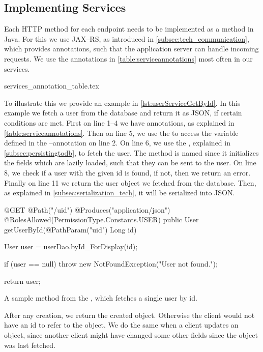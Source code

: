 \subsection{Implementing Services}
Each HTTP method for each endpoint needs to be implemented as a method in Java.
For this we use JAX--RS, as introduced in \cref{subsec:tech_communication}, which provides annotations, such that the application server can handle incoming requests.
We use the annotations in \cref{table:serviceannotations} most often in our services.

{services_annotation_table.tex}

\bigskip
To illustrate this we provide an example in \cref{lst:userServiceGetById}.
In this example we fetch a user from the database and return it as JSON, if certain conditions are met.
First on line 1--4 we have annotations, as explained in \cref{table:serviceannotations}.
Then on line 5, we use the  to access the variable defined in the --annotation on line 2.
On line 6, we use the , explained in \cref{subsec:persistingtodb}, to fetch the user.
The method is named  since it initializes the fields which are lazily loaded, such that they can be sent to the user.
On line 8, we check if a user with the given id is found, if not, then we return an error.
Finally on line 11 we return the user object we fetched from the database.
Then, as explained in \cref{subsec:serialization_tech}, it will be serialized into JSON.
\begin{listing}
    \begin{java2}
@GET
@Path("/{uid}")
@Produces("application/json")
@RolesAllowed({PermissionType.Constants.USER})
public User getUserById(@PathParam("uid") Long id) {
    User user = userDao.byId_ForDisplay(id);

    if (user == null)
        throw new NotFoundException("User not found.");

    return user;
}
    \end{java2}
    \caption{A sample method from the , which fetches a single user by id.}\label{lst:userServiceGetById}
\end{listing}

After any creation, we return the created object.
Otherwise the client would not have an id to refer to the object.
We do the same when a client updates an object,
since another client might have changed some other fields since the object was last fetched.


